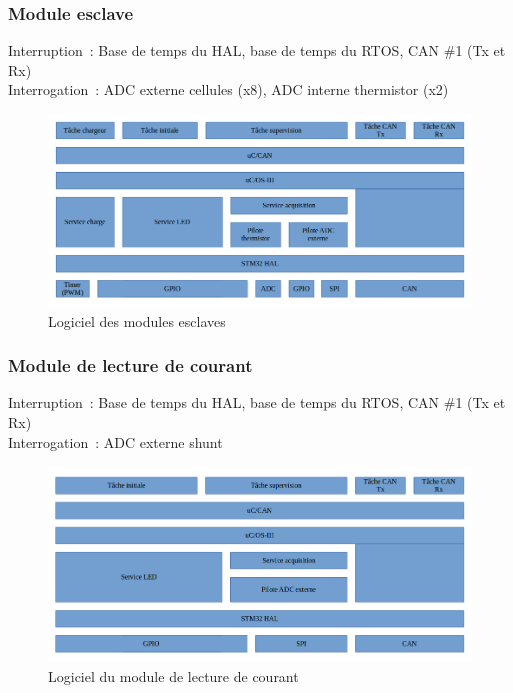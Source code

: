 	\subsubsection{Module esclave}
		\noindent
		Interruption : Base de temps du HAL, base de temps du RTOS, CAN \#1 (Tx et Rx) \\
		Interrogation : ADC externe cellules (x8), ADC interne thermistor (x2)
		\begin{figure}[H]
			\centering
			\includegraphics[scale=0.5]{Images/Logiciel_Slave.png}
			\caption{Logiciel des modules esclaves}
			\label{fig:logiciel_slave}
		\end{figure}
	\subsubsection{Module de lecture de courant}
		\noindent
		Interruption : Base de temps du HAL, base de temps du RTOS, CAN \#1 (Tx et Rx) \\
		Interrogation : ADC externe shunt
		\begin{figure}[H]
			\centering
			\includegraphics[scale=0.5]{Images/Logiciel_Current_Sense.png}
			\caption{Logiciel du module de lecture de courant}
			\label{fig:logiciel_current_sense}
		\end{figure}
